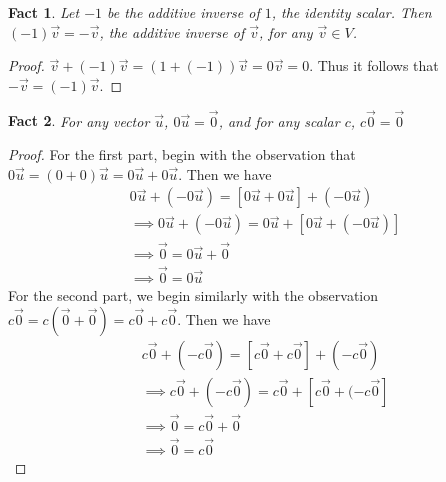 \documentclass{article}
\theoremstyle{definition}
\theoremstyle{plain}
\theoremstyle{theorem}
\newtheorem{fact}{Fact}[section]
\begin{document}
	\begin{fact}
		Let $-1$ be the additive inverse of $1$, the identity scalar. Then $(-1)\vec{v} = -\vec{v}$, the additive inverse of $\vec{v}$, for any $\vec{v} \in V$.
	\end{fact}
	\begin{proof}
		$\vec{v} + (-1)\vec{v} = (1+(-1))\vec{v} = 0\vec{v} = 0$. Thus it follows that $-\vec{v} = (-1)\vec{v}$.
	\end{proof}
	\begin{fact}
		For any vector $\vec{u}$, $0\vec{u} = \vec{0}$, and for any scalar $c$, $c\vec{0} = \vec{0}$
	\end{fact}
	\begin{proof}
		For the first part, begin with the observation that $0\vec{u} = (0+0)\vec{u} = 0\vec{u}+0\vec{u}$. Then we have
		\begin{align*}
			& 0\vec{u} + (-0\vec{u}) = [0\vec{u}+0\vec{u}] + (-0\vec{u}) \\
		&\implies 0\vec{u} + (-0\vec{u}) = 0\vec{u} + [0\vec{u}+(-0\vec{u})] \\
		&\implies \vec{0} = 0\vec{u}+\vec{0} \\
		&\implies \vec{0} = 0\vec{u}		
		\end{align*}
		For the second part, we begin similarly with the observation $c\vec{0}=c(\vec{0}+\vec{0}) = c\vec{0} + c\vec{0}$. Then we have
		\begin{align*}
			& c\vec{0}+(-c\vec{0}) = [c\vec{0}+c\vec{0}] + (-c\vec{0}) \\
			&\implies c\vec{0}+(-c\vec{0}) = c\vec{0}+[c\vec{0}+(-c\vec{0}] \\
			&\implies \vec{0} = c\vec{0}+\vec{0} \\
			&\implies \vec{0} = c\vec{0}
		\end{align*}
	\end{proof}
	
\end{document}
